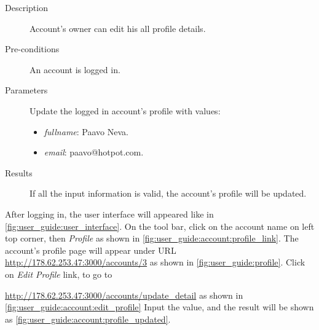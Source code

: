 \begin{description}
\item[Description] Account's owner can edit his all profile details.
\item[Pre-conditions] An account is logged in.
\item[Parameters] Update the logged in account's profile with values:
\begin{itemize}
\item \emph{fullname}: Paavo Neva.
\item \emph{email}: paavo@hotpot.com.
\end{itemize}
\item[Results] If all the input information is valid, the account's profile will be updated.
\end{description}

After logging in, the user interface will appeared like in \autoref{fig:user_guide:user_interface}.
On the tool bar, click on the account name on left top corner, then \emph{Profile} as shown in \autoref{fig:user_guide:account:profile_link}.
The account's profile page will appear under URL \href{http://178.62.253.47:3000/accounts/3}{http://178.62.253.47:3000/accounts/3} as shown in \autoref{fig:user_guide:profile}.
Click on \emph{Edit Profile} link, to go to 

\noindent\href{http://178.62.253.47:3000/accounts/update\_detail}{http://178.62.253.47:3000/accounts/update\_detail} as shown in 
\autoref{fig:user_guide:account:edit_profile}
Input the value, and the result will be shown as \autoref{fig:user_guide:account:profile_updated}.

